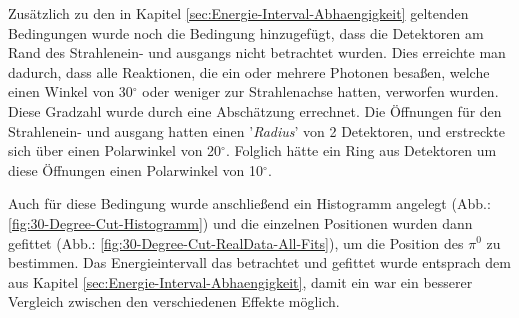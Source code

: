 \documentclass[a4paper,11pt,oneside,final,german,openbib,pdftex]{scrbook}
\begin{document}
{%


Zus\"atzlich zu den in Kapitel \ref{sec:Energie-Interval-Abhaengigkeit} geltenden Bedingungen wurde noch die Bedingung hinzugef\"ugt, dass die Detektoren am Rand des Strahlenein- und ausgangs nicht betrachtet wurden. Dies erreichte man dadurch, dass alle Reaktionen, die ein oder mehrere Photonen besa{\ss}en, welche einen Winkel von 30$^{\circ}$ oder weniger zur Strahlenachse hatten, verworfen wurden. Diese Gradzahl wurde durch eine Absch\"atzung errechnet. Die \"Offnungen f\"ur den Strahlenein- und ausgang hatten einen '\textit{Radius}' von 2 Detektoren, und erstreckte sich \"uber einen Polarwinkel von 20$^{\circ}$. Folglich h\"atte ein Ring aus Detektoren um diese \"Offnungen einen Polarwinkel von 10$^{\circ}$. 
 
Auch f\"ur diese Bedingung wurde anschlie{\ss}end ein Histogramm angelegt (Abb.: \ref{fig:30-Degree-Cut-Histogramm}) und die einzelnen Positionen wurden dann gefittet (Abb.: \ref{fig:30-Degree-Cut-RealData-All-Fits}), um die Position des $\pi^0$ zu bestimmen. Das Energieintervall das betrachtet und gefittet wurde entsprach dem aus Kapitel \ref{sec:Energie-Interval-Abhaengigkeit}, damit ein war ein besserer Vergleich zwischen den verschiedenen Effekte m\"oglich.

}
\end{document}
